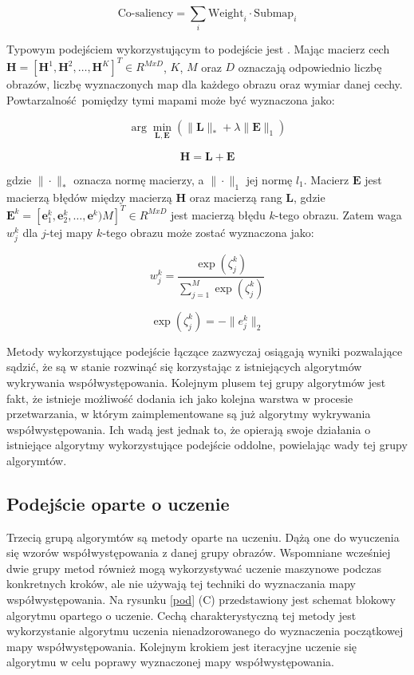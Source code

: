 \documentclass[a4paper,11pt, notitlepage, twosides, openany ]{report}
\begin{document}
	$$
	\text{Co-saliency} = \sum_i \text{Weight}_i \cdot \text{Submap}_i
	$$

	Typowym podejściem wykorzystującym to podejście jest \cite{midfeatex}. Mając macierz cech $\mathbf{H} = [\mathbf{H}^1, \mathbf{H}^2, \dots, \mathbf{H}^K]^T \in R^{M x D}$, $K$, $M$ oraz $D$ oznaczają odpowiednio liczbę obrazów, liczbę wyznaczonych map dla każdego obrazu oraz wymiar danej cechy. Powtarzalność pomiędzy tymi mapami może być wyznaczona jako:

	$$
	\arg\min_{\mathbf{L}, \mathbf{E}} \left(\|\mathbf{L}\|_* + \lambda\|\mathbf{E}\|_1\right)
	$$

	$$
	\mathbf{H} = \mathbf{L} + \mathbf{E}
	$$

	gdzie $\|\cdot\|_*$ oznacza normę macierzy, a $\|\cdot\|_1$ jej normę $l_1$. Macierz $\mathbf{E}$ jest macierzą błędów między macierzą $\mathbf{H}$ oraz macierzą rang $\mathbf{L}$, gdzie $\mathbf{E}^k=[\mathbf{e}^k_1, \mathbf{e}^k_2, \dots, \mathbf{e}^k)M]^T \in R^{M x D}$ jest macierzą błędu $k$-tego obrazu. Zatem waga $w^k_j$ dla $j$-tej mapy $k$-tego obrazu może zostać wyznaczona jako:

	$$
	w^k_j = \frac{\exp(\zeta^k_j)}{\sum^M_{j=1}\exp(\zeta^k_j)}
	$$

	$$
	\exp(\zeta^k_j) = -\|e^k_j\|_2
	$$
	
	Metody wykorzystujące podejście łączące zazwyczaj osiągają wyniki pozwalające sądzić, że są w stanie rozwinąć się korzystając z istniejących algorytmów wykrywania współwystępowania. Kolejnym plusem tej grupy algorytmów jest fakt, że istnieje możliwość dodania ich jako kolejna warstwa w procesie przetwarzania, w którym zaimplementowane są już algorytmy wykrywania współwystępowania. Ich wadą jest jednak to, że opierają swoje działania o istniejące algorytmy wykorzystujące podejście oddolne, powielając wady tej grupy algorymtów.

	\subsection{Podejście oparte o uczenie}
	Trzecią grupą algorymtów są metody oparte na uczeniu. Dążą one do wyuczenia się wzorów współwystępowania z danej grupy obrazów. Wspomniane wcześniej dwie grupy metod również mogą wykorzystywać uczenie maszynowe podczas konkretnych kroków, ale nie używają tej techniki do wyznaczania mapy współwystępowania. Na rysunku \ref{pod} (C) przedstawiony jest schemat blokowy algorytmu opartego o uczenie. Cechą charakterystyczną tej metody jest wykorzystanie algorytmu uczenia nienadzorowanego do wyznaczenia początkowej mapy współwystępowania. Kolejnym krokiem jest iteracyjne uczenie się algorytmu w celu poprawy wyznaczonej mapy współwystępowania.
\end{document}
